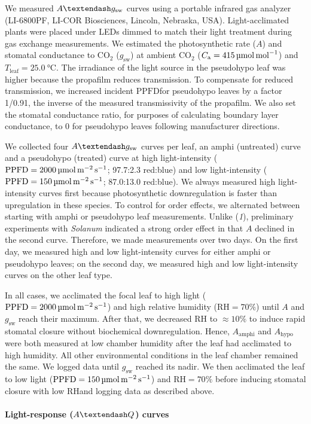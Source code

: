 \documentclass[
  letterpaper,
  DIV=11,
  numbers=noendperiod]{scrartcl}
\let\oldparagraph\paragraph
\renewcommand{\paragraph}[1]{\oldparagraph{#1}\mbox{}}
\newcommand{\Aamphi}{$A_{\mathrm{amphi}}$}
\newcommand{\Ahypo}{$A_{\mathrm{hypo}}$}
\newcommand{\agcurve}{$A \textendash g_\text{sw}$}
\newcommand{\aqcurve}{$A \textendash Q$}
\newcommand{\caequals}[1]{$C_\mathrm{a} = \qty{#1}{\micro\mol\raiseto{-1}\mol}$}
\newcommand{\gsw}{$g_\text{sw}$}
\newcommand{\ppfd}{$\mathrm{PPFD}$}
\newcommand{\ppfdequals}[1]{$\mathrm{PPFD} = \qty{#1}{\micro\mol\raiseto{-2}\meter\raiseto{-1}\second}$}
\newcommand{\rh}{$\mathrm{RH}$}
\newcommand{\rhequals}[1]{$\mathrm{RH} = #1\%$}
\newcommand{\tleafequals}[1]{$T_\mathrm{leaf} = \qty{#1}{\degreeCelsius}$}
\begin{document}
We measured \agcurve{} curves using a portable infrared gas analyzer
(LI-6800PF, LI-COR Biosciences, Lincoln, Nebraska, USA).
Light-acclimated plants were placed under LEDs dimmed to match their
light treatment during gas exchange measurements. We estimated the
photosynthetic rate (\(A\)) and stomatal conductance to CO\(_2\) (\gsw)
at ambient CO\(_2\) (\caequals{415}) and \tleafequals{25.0}. The
irradiance of the light source in the pseudohypo leaf was higher because
the propafilm reduces transmission. To compensate for reduced
transmission, we increased incident \ppfd for pseudohypo leaves by a
factor 1/0.91, the inverse of the measured transmissivity of the
propafilm. We also set the stomatal conductance ratio, for purposes of
calculating boundary layer conductance, to 0 for pseudohypo leaves
following manufacturer directions.

We collected four \agcurve{} curves per leaf, an amphi (untreated) curve
and a pseudohypo (treated) curve at high light-intensity
(\ppfdequals{2000}; 97.7:2.3 red:blue) and low light-intensity
(\ppfdequals{150}; 87.0:13.0 red:blue). We always measured high
light-intensity curves first because photosynthetic downregulation is
faster than upregulation in these species. To control for order effects,
we alternated between starting with amphi or pseudohypo leaf
measurements. Unlike (\emph{1}), preliminary experiments with
\emph{Solanum} indicated a strong order effect in that \(A\) declined in
the second curve. Therefore, we made measurements over two days. On the
first day, we measured high and low light-intensity curves for either
amphi or pseudohypo leaves; on the second day, we measured high and low
light-intensity curves on the other leaf type.

In all cases, we acclimated the focal leaf to high light
(\ppfdequals{2000}) and high relative humidity (\rhequals{70}) until
\(A\) and \gsw{} reach their maximum. After that, we decreased \rh{} to
\(\approx 10\%\) to induce rapid stomatal closure without biochemical
downregulation. Hence, \Aamphi{} and \Ahypo{} were both measured at low
chamber humidity after the leaf had acclimated to high humidity. All
other environmental conditions in the leaf chamber remained the same. We
logged data until \gsw{} reached its nadir. We then acclimated the leaf
to low light (\ppfdequals{150}) and \rhequals{70} before inducing
stomatal closure with low \rh and logging data as described above.

\paragraph{\texorpdfstring{Light-response (\aqcurve)
curves}{Light-response () curves}}\label{light-response-curves}
\end{document}

